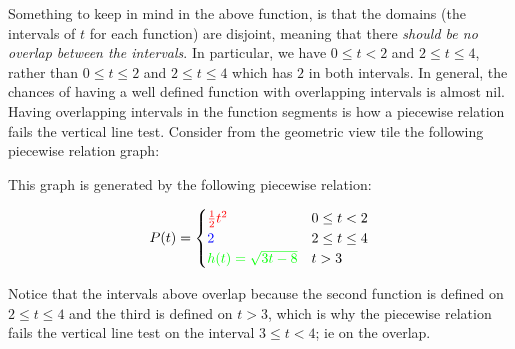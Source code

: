 \documentclass{ximeraXloud}
\begin{document}
Something to keep in mind in the above function, is that the domains (the intervals of $t$ for each function) are disjoint, meaning that there \textit{should be no overlap between the intervals}. In particular, we have $0 \leq t < 2$ and $2 \leq t \leq 4$, rather than $0 \leq t \leq 2$ and $2 \leq t \leq 4$ which has $2$ in both intervals. In general, the chances of having a well defined function with overlapping intervals is almost nil. Having overlapping intervals in the function segments is how a piecewise relation fails the vertical line test. Consider from the geometric view tile the following piecewise relation graph:

\begin{center}
\end{center}

This graph is generated by the following piecewise relation:


\[
    P(t) =
        \begin{cases}
            {\color{red}\frac{1}{2}t^2} & 0\leq t < 2 \\
            {\color{blue} 2} & 2 \leq t \leq 4 \\
            {\color{green} h(t) = \sqrt{3t-8}} & t > 3
        \end{cases}
\]

Notice that the intervals above overlap because the second function is defined on $2 \leq t \leq 4$ and the third is defined on $t > 3$, which is why the piecewise relation fails the vertical line test on the interval $3 \leq t < 4$; ie on the overlap.
\end{document}

